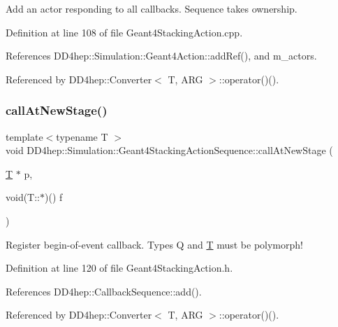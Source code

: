 Add an actor responding to all callbacks. Sequence takes ownership. 



Definition at line 108 of file Geant4\+Stacking\+Action.\+cpp.



References D\+D4hep\+::\+Simulation\+::\+Geant4\+Action\+::add\+Ref(), and m\+\_\+actors.



Referenced by D\+D4hep\+::\+Converter$<$ T, A\+R\+G $>$\+::operator()().

\hypertarget{class_d_d4hep_1_1_simulation_1_1_geant4_stacking_action_sequence_a65b099f0aaec99e83aea53e42f33cfa9}{}\label{class_d_d4hep_1_1_simulation_1_1_geant4_stacking_action_sequence_a65b099f0aaec99e83aea53e42f33cfa9} 
\subsubsection{\texorpdfstring{call\+At\+New\+Stage()}{callAtNewStage()}}
{\footnotesize\ttfamily template$<$typename T $>$ \\
void D\+D4hep\+::\+Simulation\+::\+Geant4\+Stacking\+Action\+Sequence\+::call\+At\+New\+Stage (\begin{DoxyParamCaption}\item[{\hyperlink{class_t}{T} $\ast$}]{p,  }\item[{void(T\+::$\ast$)()}]{f }\end{DoxyParamCaption})\hspace{0.3cm}{\ttfamily [inline]}}



Register begin-\/of-\/event callback. Types Q and \hyperlink{class_t}{T} must be polymorph! 



Definition at line 120 of file Geant4\+Stacking\+Action.\+h.



References D\+D4hep\+::\+Callback\+Sequence\+::add().



Referenced by D\+D4hep\+::\+Converter$<$ T, A\+R\+G $>$\+::operator()().

